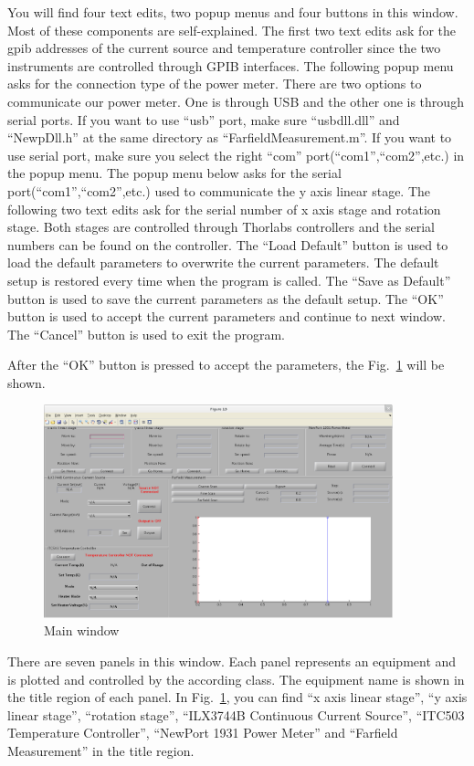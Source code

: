 \documentclass[a4paper,12pt]{article}
\begin{document}
You will find four text edits, two popup menus and four buttons in this window.
Most of these components are self-explained. The first two text edits ask for
the gpib addresses of the current source and temperature controller since the
two instruments are controlled through GPIB interfaces. The following popup menu
asks for the connection type of the power meter. There are two options to
communicate our power meter. One is through USB and the other one is through
serial ports. If you want to use ``usb'' port, make sure ``usbdll.dll'' and
``NewpDll.h'' at the same directory as ``FarfieldMeasurement.m''. If you want to
use serial port, make sure you select the right ``com''
port(``com1'',``com2'',etc.) in the popup menu. The popup menu below asks for
the serial port(``com1'',``com2'',etc.) used to communicate the y axis linear
stage. The following two text edits ask for the serial number of x axis stage
and rotation stage. Both stages are controlled through Thorlabs controllers and
the serial numbers can be found on the controller. The ``Load Default'' button is used to load the default parameters to
overwrite the current parameters. The default setup is restored every time when
the program is called. The ``Save as Default'' button is used to save the
current parameters as the default setup. The ``OK'' button is used to accept the
current parameters and continue to next window. The ``Cancel'' button is used to
exit the program.

After the ``OK'' button is pressed to accept the parameters, the
Fig.~\ref{fig:main_window} will be shown.
\begin{figure}[htbp]
	\centering
	\includegraphics[width=0.9\textwidth]{./figs/main_window.eps}
	\caption{Main window}
	\label{fig:main_window}
\end{figure}

There are seven panels in this window. Each panel represents an equipment and is
plotted and controlled by the according class. The equipment name is shown in
the title region of each panel. In Fig.~\ref{fig:main_window}, you can find ``x
axis linear stage'', ``y axis linear stage'', ``rotation stage'', ``ILX3744B
Continuous Current Source'', ``ITC503 Temperature Controller'', ``NewPort 1931
Power Meter'' and ``Farfield Measurement'' in the title region. 
\end{document}
